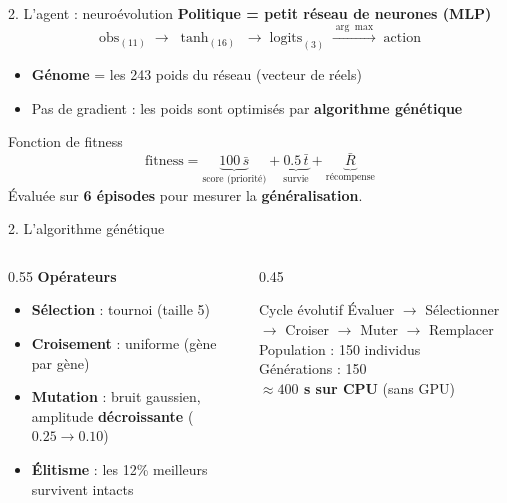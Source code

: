 \documentclass[11pt,aspectratio=169]{beamer}
\begin{document}
\begin{frame}{2. L'agent : neuroévolution}
  \textbf{Politique = petit réseau de neurones (MLP)}
  \[
  \text{obs}_{(11)} \;\to\; \tanh_{(16)} \;\to\; \text{logits}_{(3)} \;\xrightarrow{\arg\max}\; \text{action}
  \]
  \begin{itemize}
    \item \textbf{Génome} = les 243 poids du réseau (vecteur de réels)
    \item Pas de gradient : les poids sont optimisés par \textbf{algorithme génétique}
  \end{itemize}
  \vspace{0.3cm}
  \begin{block}{Fonction de fitness}
    \[
    \text{fitness} = \underbrace{100\,\bar{s}}_{\text{score (priorité)}}
    + \underbrace{0.5\,\bar{t}}_{\text{survie}}
    + \underbrace{\bar{R}}_{\text{récompense}}
    \]
    Évaluée sur \textbf{6 épisodes} pour mesurer la \textbf{généralisation}.
  \end{block}
\end{frame}

\begin{frame}{2. L'algorithme génétique}
  \begin{columns}
    \begin{column}{0.55\textwidth}
      \textbf{Opérateurs}
      \begin{itemize}
        \item \textbf{Sélection} : tournoi (taille 5)
        \item \textbf{Croisement} : uniforme (gène par gène)
        \item \textbf{Mutation} : bruit gaussien, amplitude
              \textbf{décroissante} ($0.25 \to 0.10$)
        \item \textbf{Élitisme} : les 12\% meilleurs survivent intacts
      \end{itemize}
    \end{column}
    \begin{column}{0.45\textwidth}
      \begin{block}{Cycle évolutif}
        \footnotesize
        Évaluer $\to$ Sélectionner $\to$ Croiser $\to$ Muter $\to$ Remplacer
        \\[0.2cm]
        \normalsize
        Population : 150 individus\\
        Générations : 150\\
        \textbf{$\approx 400$ s sur CPU} (sans GPU)
      \end{block}
    \end{column}
  \end{columns}
\end{frame}
\end{document}
